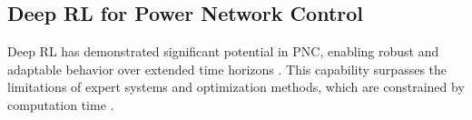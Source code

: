 



\subsection{Deep RL for Power Network Control}\label{sec:RLL2RPN}
Deep RL has demonstrated significant potential in PNC, enabling robust and adaptable behavior over extended time horizons \cite{viebahn2022potential}. This capability surpasses the limitations of expert systems \cite{marot2018expert} and optimization methods, which are constrained by computation time \cite{ruiz2016security,little2021optimal,heidarifar2021optimal}.

